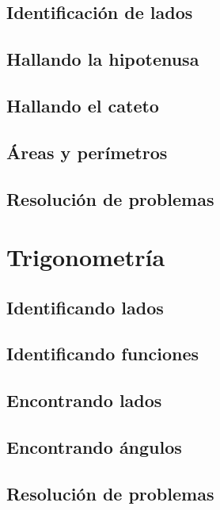 \documentclass[12pt,addpoints]{repaso}
\begin{document}
\begin{questions}
    \subsection*{Identificación de lados}
    \subsection*{Hallando la hipotenusa}
    \subsection*{Hallando el cateto}
    \subsection*{Áreas y perímetros}
    \subsection*{Resolución de problemas}
    \section*{   Trigonometría}
    \subsection*{Identificando lados}
    \subsection*{Identificando funciones}
    \subsection*{Encontrando lados}
    \subsection*{Encontrando ángulos}
    \subsection*{Resolución de problemas}
    \questionboxed[10]{}
\end{questions}
\end{document}
